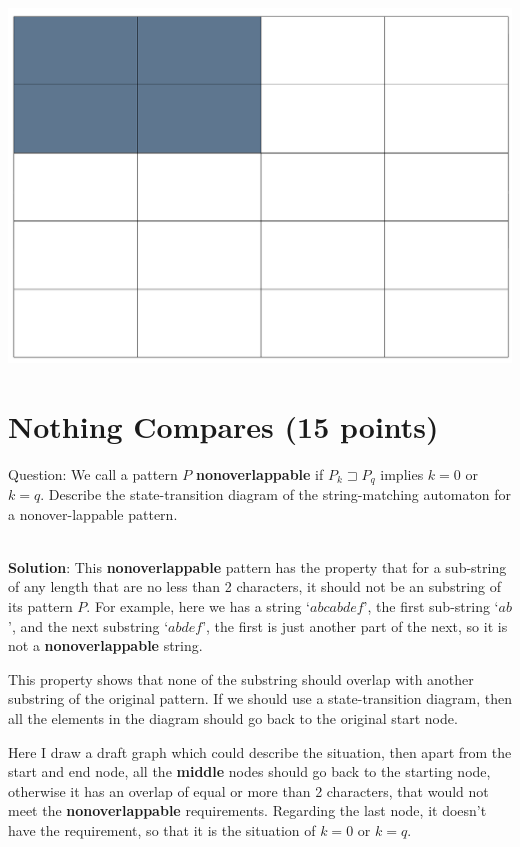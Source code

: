 \documentclass{article}
\begin{document}
\begin{center}
\includegraphics[scale=0.2]{hw7_1.png}
\end{center}


\section{Nothing Compares (15 points)}
Question: We call a pattern $P$ \textbf{nonoverlappable} if $P_{k} \sqsupset P_{q}$ implies $k = 0$ or $k = q$. Describe the state-transition diagram of the string-matching automaton for a nonover-lappable pattern.

~\\
\textbf{Solution}:\newline
\indent This \textbf{nonoverlappable} pattern has the property that for a sub-string of any length that are no less than 2 characters, it should not be an substring of its pattern $P$. For example, here we has a string `$abcabdef$', the first sub-string `$ab$', and the next substring `$abdef$', the first is just another part of the next, so it is not a \textbf{nonoverlappable} string.

This property shows that none of the substring should overlap with another substring of the original pattern. If we should use a state-transition diagram, then all the elements in the diagram should go back to the original start node.

Here I draw a draft graph which could describe the situation, then apart from the start and end node, all the \textbf{middle} nodes should go back to the starting node, otherwise it has an overlap of equal or more than 2 characters, that would not meet the \textbf{nonoverlappable} requirements. Regarding the last node, it doesn't have the requirement, so that it is the situation of $k = 0$ or $k = q$.
\end{document}
